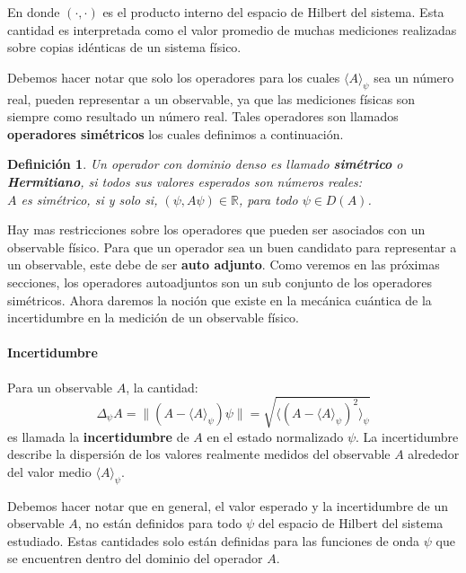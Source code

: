\documentclass[12pt]{book}
\numberwithin{equation}{chapter}
\newtheorem{definition}[theorem]{Definici\'on}
\def\R{\mathbb{R}}
\def\la{\langle}
\def\ra{\rangle}
\begin{document}
En donde $(\cdot , \cdot)$ es el producto interno del espacio de Hilbert del sistema. Esta cantidad es interpretada como el valor promedio de muchas mediciones realizadas sobre copias id\'enticas de un sistema f\'isico.

\rightline{$\dag$}
\vspace{3 mm} 

Debemos hacer notar que solo los operadores para los cuales $\la A \ra_{\psi}$ sea un n\'umero real, pueden representar a un observable, ya que las mediciones f\'isicas son siempre como resultado un n\'umero real. Tales operadores son llamados {\bf operadores sim\'etricos} los cuales definimos a continuaci\'on.

\begin{definition}\label{op-s}
Un operador con dominio denso es llamado {\bf sim\'etrico} o {\bf Hermitiano}, si todos sus valores esperados son n\'umeros reales:\\

$A$ es sim\'etrico, si y solo si, $(\psi , A \psi) \in \R$, para todo $\psi \in D(A)$. 
\end{definition} 

Hay mas restricciones sobre los operadores que pueden ser asociados con un observable f\'isico. Para que un operador sea un buen candidato para representar a un observable, este debe de ser {\bf auto adjunto}. Como veremos en las pr\'oximas secciones, los operadores autoadjuntos son un sub conjunto  de los operadores sim\'etricos. Ahora daremos la noci\'on que existe en la mec\'anica cu\'antica de la incertidumbre en la medici\'on de un observable f\'isico.

\paragraph{Incertidumbre}
Para un observable $A$, la cantidad:
\begin{equation}
\Delta_{\psi} A = \| ( A-\la A \ra_{\psi} ) \psi \|= \sqrt{ \la  (A-\la A \ra_{\psi})^{2}  \ra_{\psi} }
\end{equation}
es llamada la {\bf incertidumbre} de $A$ en el estado normalizado $\psi$. La incertidumbre describe la dispersi\'on de los valores realmente medidos del observable $A$ alrededor del valor medio $\la A \ra_{\psi}$.

\rightline{$\dag$}
\vspace{5 mm}    

Debemos hacer notar que en general, el valor esperado y la incertidumbre de un observable $A$, no est\'an definidos para todo $\psi$ del espacio de Hilbert del sistema estudiado. Estas cantidades solo est\'an definidas para las funciones de onda $\psi$ que se encuentren dentro del dominio del operador $A$.
\end{document}
